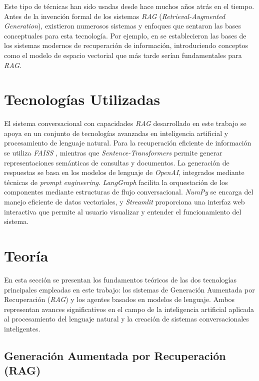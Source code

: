 \documentclass[12pt,letterpaper]{article}
\begin{document}
Este tipo de técnicas han sido usadas desde hace muchos años atrás en el tiempo. Antes de la invención formal de los sistemas \textit{RAG} (\textit{Retrieval-Augmented Generation}), existieron numerosos sistemas y enfoques que sentaron las bases conceptuales para esta tecnología. Por ejemplo, en \cite{salton1983introduction} se establecieron las bases de los sistemas modernos de recuperación de información, introduciendo conceptos como el modelo de espacio vectorial que más tarde serían fundamentales para \textit{RAG}.

\section{Tecnologías Utilizadas}

El sistema conversacional con capacidades \textit{RAG} desarrollado en este trabajo se apoya en un conjunto de tecnologías avanzadas en inteligencia artificial y procesamiento de lenguaje natural. Para la recuperación eficiente de información se utiliza \textit{FAISS} \cite{johnson2019billion}, mientras que \textit{Sentence-Transformers} permite generar representaciones semánticas de consultas y documentos. La generación de respuestas se basa en los modelos de lenguaje de \textit{OpenAI}, integrados mediante técnicas de \textit{prompt engineering}. \textit{LangGraph} facilita la orquestación de los componentes mediante estructuras de flujo conversacional. \textit{NumPy} se encarga del manejo eficiente de datos vectoriales, y \textit{Streamlit} proporciona una interfaz web interactiva que permite al usuario visualizar y entender el funcionamiento del sistema.


\section{Teoría}

En esta sección se presentan los fundamentos teóricos de las dos tecnologías principales empleadas en este trabajo: los sistemas de Generación Aumentada por Recuperación (\textit{RAG}) y los agentes basados en modelos de lenguaje. Ambos representan avances significativos en el campo de la inteligencia artificial aplicada al procesamiento del lenguaje natural y la creación de sistemas conversacionales inteligentes.

\subsection{Generación Aumentada por Recuperación (RAG)}
\end{document}
